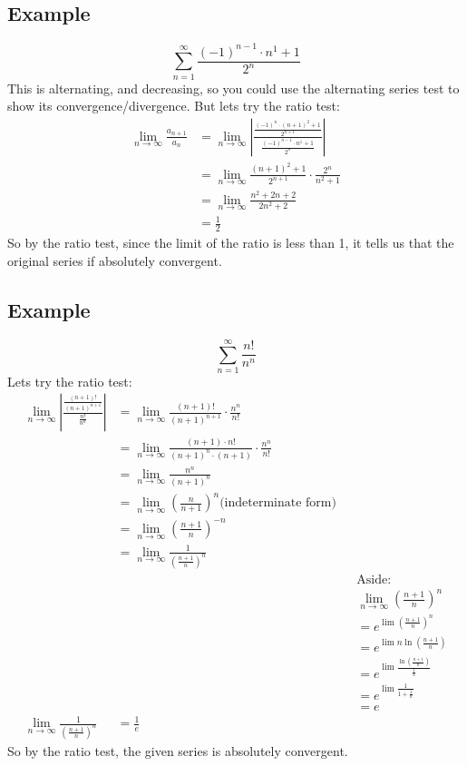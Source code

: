 \documentclass{article}
\begin{document}
    \subsection{Example}
        \[\sum_{n = 1}^{\infty} \frac{(-1)^{n-1} \cdot n^1 + 1}{2^n} \]
        This is alternating, and decreasing, so you could use the alternating series test to show its convergence/divergence.
        But lets try the ratio test:
        \begin{align*}
            \lim_{n \to \infty} \frac{a_{n+1}}{a_n} & = \lim_{n \to \infty} \left| \frac{\frac{(-1)^n \cdot (n+1)^2 + 1}{2^{n+1}}}{\frac{(-1)^{n-1} \cdot n^1 + 1}{2^n}} \right| \\
            & = \lim_{n \to \infty} \frac{(n+1)^2 + 1}{2^{n+1}} \cdot \frac{2^n}{n^2+1} \\
            & = \lim_{n \to \infty} \frac{n^2+2n+2}{2n^2+2} \\
            & = \frac{1}{2}
        \end{align*}
        So by the ratio test, since the limit of the ratio is less than 1, it tells us that the original series if absolutely convergent.
    
    \subsection{Example}
        \[\sum_{n = 1}^{\infty} \frac{n!}{n^n} \]
        Lets try the ratio test:
        \begin{align*}
            \lim_{n \to \infty} \left| \frac{\frac{(n+1)!}{(n+1)^{n+1}}}{\frac{n!}{n^n}} \right| & = \lim_{n \to \infty} \frac{(n+1)!}{(n+1)^{n+1}} \cdot \frac{n^n}{n!} \\
            & = \lim_{n \to \infty} \frac{(n+1) \cdot n!}{(n+1)^{n} \cdot (n+1)} \cdot \frac{n^n}{n!} \\
            & = \lim_{n \to \infty} \frac{n^n}{(n+1)^n} \\
            & = \lim_{n \to \infty} \left( \frac{n}{n+1} \right)^n \text{(indeterminate form)}\\
            & = \lim_{n \to \infty} \left( \frac{n+1}{n}\right)^{-n} \\
            & = \lim_{n \to \infty} \frac{1}{\left( \frac{n+1}{n}\right)^{n}} \\
            && &\text{Aside:} \\
            && &\lim_{n \to \infty} \left( \frac{n+1}{n}\right)^{n} \\
            && &= e^{\lim \left( \frac{n+1}{n}\right)^{n}} \\
            && &= e^{\lim n \ln \left( \frac{n+1}{n}\right)} \\
            && &= e^{\lim \frac{\ln \left( \frac{n+1}{n}\right)}{\frac{1}{n}}} \\
            && &= e^{\lim \frac{1}{1+\frac{1}{n}}} \\
            && &= e \\
            \lim_{n \to \infty} \frac{1}{\left( \frac{n+1}{n}\right)^{n}} &= \frac{1}{e}
        \end{align*}
       So by the ratio test, the given series is absolutely convergent.
    
\end{document}
